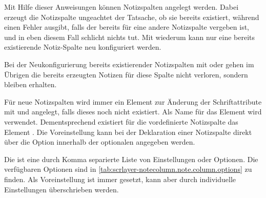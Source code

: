 \begin{Declaration}
\end{Declaration}
Mit Hilfe dieser Anweisungen können Notizspalten angelegt werden. Dabei
erzeugt  die Notizspalte ungeachtet der Tatsache, ob
sie bereits existiert, während  einen
Fehler ausgibt, falls der  bereits für eine andere
Notizspalte vergeben ist, und  in eben diesem Fall
schlicht nichts tut. Mit  wiederum kann nur eine
bereits existierende Notiz-Spalte neu konfiguriert werden.

Bei der Neukonfigurierung bereits existierender Notizspalten mit
 oder  gehen im Übrigen
die bereits erzeugten Notizen für diese Spalte nicht verloren, sondern bleiben
erhalten.

%
%
Für neue Notizspalten wird immer ein Element zur Änderung der Schriftattribute
mit  und  angelegt,
falls dieses noch nicht existiert. Als Name für das Element wird
 verwendet. Dementsprechend
existiert für die vordefinierte Notizspalte  das
Element . Die
Voreinstellung kann bei der Deklaration einer Notizspalte direkt über die
Option  innerhalb der optionalen 
angegeben werden.%
%
%

Die  ist eine durch Komma separierte Liste von
Einstellungen oder Optionen. Die verfügbaren Optionen sind in
\autoref{tab:scrlayer-notecolumn.note.column.options} %
\iffalse %
\unskip, \autopageref{tab:scrlayer-notecolumn.note.column.options} %
\fi%
zu finden. Als
Voreinstellung ist  immer gesetzt, kann aber durch
individuelle Einstellungen überschrieben werden.

